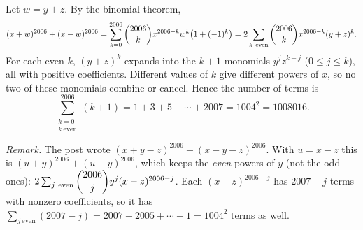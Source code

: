 Let $w=y+z$. By the binomial theorem,
\[(x+w)^{2006}+(x-w)^{2006}=\sum_{k=0}^{2006}\dbinom{2006}{k}x^{2006-k}w^k\bigl(1+(-1)^k\bigr)=2\sum_{k\ \text{even}}\dbinom{2006}{k}x^{2006-k}(y+z)^k.\]
For each even $k$, $(y+z)^k$ expands into the $k+1$ monomials $y^jz^{k-j}$ ($0\le j\le k$), all with positive coefficients. Different values of $k$ give different powers of $x$, so no two of these monomials combine or cancel. Hence the number of terms is
\[\sum_{\substack{k=0\\k\ \text{even}}}^{2006}(k+1)=1+3+5+\cdots+2007=1004^2=\boxed{1008016}.\]

\emph{Remark.} The post wrote $(x+y-z)^{2006}+(x-y-z)^{2006}$. With $u=x-z$ this is $(u+y)^{2006}+(u-y)^{2006}$, which keeps the \emph{even} powers of $y$ (not the odd ones): $2\sum_{j\ \text{even}}\dbinom{2006}{j}y^j(x-z)^{2006-j}$. Each $(x-z)^{2006-j}$ has $2007-j$ terms with nonzero coefficients, so it has $\sum_{j\ \text{even}}(2007-j)=2007+2005+\cdots+1=1004^2$ terms as well.
